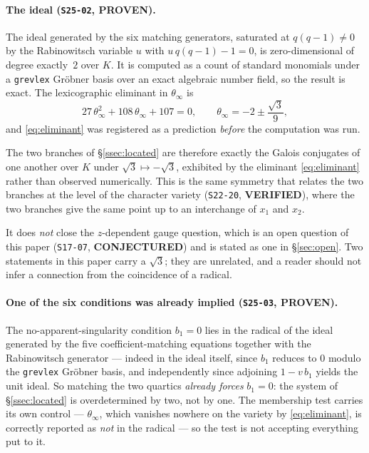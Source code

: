 \paragraph{The ideal (\texttt{S25-02}, \textbf{PROVEN}).}
The ideal generated by the six matching generators, saturated at $q(q-1)\neq0$
by the Rabinowitsch variable $u$ with $u\,q(q-1)-1=0$, is zero-dimensional of
degree exactly~$2$ over $K$. It is computed as a count of standard monomials
under a \texttt{grevlex} Gr\"obner basis over an exact algebraic number field,
so the result is exact. The lexicographic eliminant in $\theta_\infty$ is
\begin{equation}\label{eq:eliminant}
  27\,\theta_\infty^2+108\,\theta_\infty+107=0,
  \qquad
  \theta_\infty=-2\pm\frac{\sqrt3}{9},
\end{equation}
and \eqref{eq:eliminant} was registered as a prediction \emph{before} the
computation was run.

\begin{remark}\label{rem:galois}
The two branches of \S\ref{ssec:located} are therefore exactly the Galois
conjugates of one another over $K$ under $\sqrt3\mapsto-\sqrt3$, exhibited by
the eliminant \eqref{eq:eliminant} rather than observed numerically. This is
the same symmetry that relates the two branches at the level of the character
variety (\texttt{S22-20}, \textbf{VERIFIED}), where the two branches give the
same point up to an interchange of $x_1$ and $x_2$.

It does \emph{not} close the $z$-dependent gauge question, which is an open
question of this paper (\texttt{S17-07}, \textbf{CONJECTURED}) and is stated as
one in \S\ref{sec:open}. Two statements in this paper carry a $\sqrt3$; they
are unrelated, and a reader should not infer a connection from the coincidence
of a radical.
\end{remark}

\paragraph{One of the six conditions was already implied (\texttt{S25-03},
\textbf{PROVEN}).}
The no-apparent-singularity condition $b_1=0$ lies in the radical of the ideal
generated by the five coefficient-matching equations together with the
Rabinowitsch generator --- indeed in the ideal itself, since $b_1$ reduces to
$0$ modulo the \texttt{grevlex} Gr\"obner basis, and independently since
adjoining $1-v\,b_1$ yields the unit ideal. So matching the two quartics
\emph{already forces} $b_1=0$: the system of \S\ref{ssec:located} is
overdetermined by two, not by one. The membership test carries its own control
--- $\theta_\infty$, which vanishes nowhere on the variety by
\eqref{eq:eliminant}, is correctly reported as \emph{not} in the radical --- so
the test is not accepting everything put to it.

